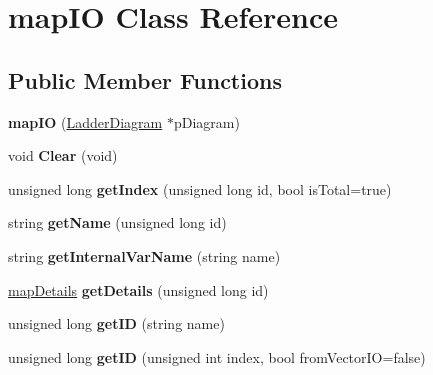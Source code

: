 \hypertarget{classmap_i_o}{\section{map\-I\-O Class Reference}
\label{classmap_i_o}
}
\subsection*{Public Member Functions}
\begin{DoxyCompactItemize}
\item 
\hypertarget{classmap_i_o_a574a8eeb76fa0865f49cea7702641332}{{\bfseries map\-I\-O} (\hyperlink{class_ladder_diagram}{Ladder\-Diagram} $\ast$p\-Diagram)}\label{classmap_i_o_a574a8eeb76fa0865f49cea7702641332}

\item 
\hypertarget{classmap_i_o_a7dd3e3f2bf62ce7fdad02c39f8bdc527}{void {\bfseries Clear} (void)}\label{classmap_i_o_a7dd3e3f2bf62ce7fdad02c39f8bdc527}

\item 
\hypertarget{classmap_i_o_a67a3f3aad0afddf9e632b2cf1f05c256}{unsigned long {\bfseries get\-Index} (unsigned long id, bool is\-Total=true)}\label{classmap_i_o_a67a3f3aad0afddf9e632b2cf1f05c256}

\item 
\hypertarget{classmap_i_o_a1437bd04cdfcdd0ddb3a9efb8820d60e}{string {\bfseries get\-Name} (unsigned long id)}\label{classmap_i_o_a1437bd04cdfcdd0ddb3a9efb8820d60e}

\item 
\hypertarget{classmap_i_o_af7770b2d50a3dadc5879151dade13840}{string {\bfseries get\-Internal\-Var\-Name} (string name)}\label{classmap_i_o_af7770b2d50a3dadc5879151dade13840}

\item 
\hypertarget{classmap_i_o_a627aa75446b70cc145e0b51a2d31e048}{\hyperlink{structmap_details}{map\-Details} {\bfseries get\-Details} (unsigned long id)}\label{classmap_i_o_a627aa75446b70cc145e0b51a2d31e048}

\item 
\hypertarget{classmap_i_o_ac254f85ed396d54b33d95bc66b237676}{unsigned long {\bfseries get\-I\-D} (string name)}\label{classmap_i_o_ac254f85ed396d54b33d95bc66b237676}

\item 
\hypertarget{classmap_i_o_a6bd13708c1284bf9c30875219ded6c38}{unsigned long {\bfseries get\-I\-D} (unsigned int index, bool from\-Vector\-I\-O=false)}\label{classmap_i_o_a6bd13708c1284bf9c30875219ded6c38}


\end{DoxyCompactItemize}
